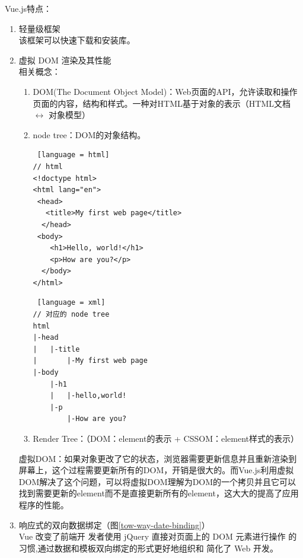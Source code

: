Vue.js特点：
\begin{enumerate}
  \item 轻量级框架\\该框架可以快速下载和安装库。
  \item 虚拟 DOM 渲染及其性能\\
        相关概念：
        \begin{enumerate}
          \item DOM(The Document Object Model)：Web页面的API，允许读取和操作页面的内容，结构和样式。一种对HTML基于对象的表示（HTML文档 $\leftrightarrow$ 对象模型）
          \item node tree：DOM的对象结构。
                \begin{lstlisting} [language = html]
// html
<!doctype html>
<html lang="en">
 <head>
   <title>My first web page</title>
  </head>
 <body>
    <h1>Hello, world!</h1>
    <p>How are you?</p>
  </body>
</html>
          \end{lstlisting}
                \begin{lstlisting} [language = xml]
// 对应的 node tree
html
|-head
|   |-title
|       |-My first web page
|-body
    |-h1
    |   |-hello,world!
    |-p
        |-How are you?
\end{lstlisting}
          \item Render Tree：（DOM：element的表示 + CSSOM：element样式的表示）
        \end{enumerate}
        虚拟DOM：如果对象更改了它的状态，浏览器需要更新信息并且重新渲染到屏幕上，这个过程需要更新所有的DOM，开销是很大的。而Vue.js利用虚拟DOM解决了这个问题，可以将虚拟DOM理解为DOM的一个拷贝并且它可以找到需要更新的element而不是直接更新所有的element，这大大的提高了应用程序的性能。
  \item 响应式的双向数据绑定（图\ref{tow-way-date-binding}）\\
        Vue 改变了前端开 发者使用 jQuery 直接对页面上的 DOM 元素进行操作 的习惯,通过数据和模板双向绑定的形式更好地组织和 简化了 Web 开发。\cite{.2020g}


\end{enumerate}
